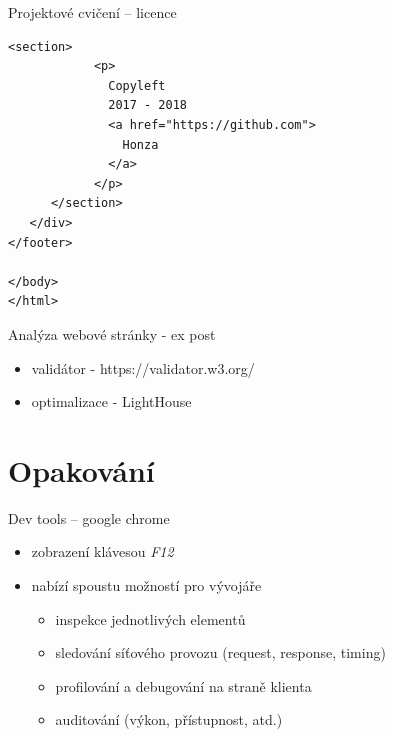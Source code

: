 \documentclass{beamer}
\begin{document}
\begin{frame}[fragile, shrink=0]{Projektové cvičení -- licence }

\begin{lstlisting}[language=HTML5]
        <section>
            <p>
              Copyleft
              2017 - 2018 
              <a href="https://github.com">
                Honza
              </a>
            </p>
      </section>
   </div>
</footer>

</body>
</html>
\end{lstlisting}
	
\end{frame}




\begin{frame}{Analýza webové stránky - ex post}

\begin{itemize}
	\item validátor - https://validator.w3.org/
	\item optimalizace - LightHouse
\end{itemize}
	
\end{frame}

\section{Opakování}

\begin{frame}{Dev tools -- google chrome}

	\begin{itemize}
		\item zobrazení klávesou \emph{F12}
		\item nabízí spoustu možností pro vývojáře
		\begin{itemize}
			\item inspekce jednotlivých elementů
			\item sledování síťového provozu (request, response, timing)
			\item profilování a debugování na straně klienta
			\item auditování (výkon, přístupnost, atd.)
			
		\end{itemize} 
	\end{itemize}

\end{frame}
\end{document}
